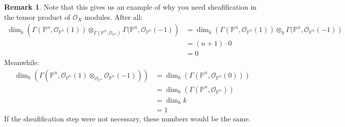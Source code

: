 \documentclass[10pt,reqno]{amsart}
\theoremstyle{definition}
\newtheorem{remark}[theorem]{Remark}
\theoremstyle{remark}
\numberwithin{equation}{section}
\numberwithin{theorem}{section}
\newcommand{\OO}{{\mathcal O}}
\newcommand{\PP}{{\mathbb P}}
\begin{document}

\begin{remark} Note that this gives us an example of why you need sheafification in the tensor product of $\OO_X$ modules. After all:
\begin{align*}
\dim_k \left(\Gamma(\PP^n, \OO_{\PP^n}(1)) \otimes_{\Gamma(\PP^n, \OO_{\PP^n})} \Gamma(\PP^n, \OO_{\PP^n}(-1)\right) &= \dim_k \left(\Gamma(\PP^n, \OO_{\PP^n}(1)) \otimes_k \Gamma(\PP^n, \OO_{\PP^n}(-1)\right)\\
& = (n+1) \cdot 0 \\
& = 0
\end{align*}
Meanwhile:
\begin{align*}
\dim_k(\Gamma(\PP^n, \OO_{\PP^n}(1) \otimes_{\OO_{\PP^n}} \OO_{\PP^n}(-1))) &= \dim_k(\Gamma(\PP^n, \OO_{\PP^n}(0)))\\
&= \dim_k(\Gamma(\PP^n, \OO_{\PP^n}))\\
&= \dim_k k\\
&= 1
\end{align*}
If the sheafification step were not necessary, these numbers would be the same.
\end{remark}
\end{document}
